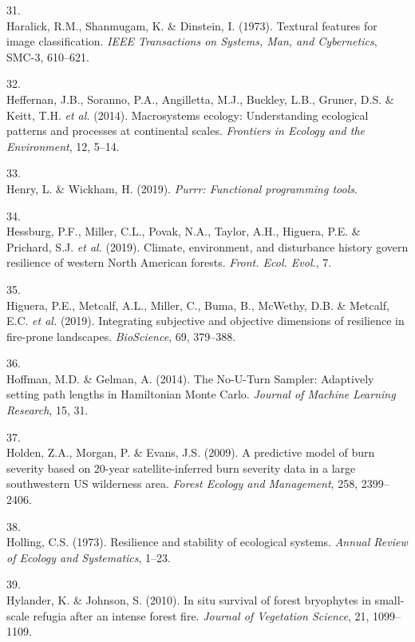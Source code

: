 \documentclass[]{article}
\begin{document}
\leavevmode\hypertarget{ref-haralick1973}{}%
31.\\
Haralick, R.M., Shanmugam, K. \& Dinstein, I. (1973). Textural features
for image classification. \emph{IEEE Transactions on Systems, Man, and
Cybernetics}, SMC-3, 610--621.

\leavevmode\hypertarget{ref-heffernan2014}{}%
32.\\
Heffernan, J.B., Soranno, P.A., Angilletta, M.J., Buckley, L.B., Gruner,
D.S. \& Keitt, T.H. \emph{et al.} (2014). Macrosystems ecology:
Understanding ecological patterns and processes at continental scales.
\emph{Frontiers in Ecology and the Environment}, 12, 5--14.

\leavevmode\hypertarget{ref-henry2019}{}%
33.\\
Henry, L. \& Wickham, H. (2019). \emph{Purrr: Functional programming
tools}.

\leavevmode\hypertarget{ref-hessburg2019}{}%
34.\\
Hessburg, P.F., Miller, C.L., Povak, N.A., Taylor, A.H., Higuera, P.E.
\& Prichard, S.J. \emph{et al.} (2019). Climate, environment, and
disturbance history govern resilience of western North American forests.
\emph{Front. Ecol. Evol.}, 7.

\leavevmode\hypertarget{ref-higuera2019}{}%
35.\\
Higuera, P.E., Metcalf, A.L., Miller, C., Buma, B., McWethy, D.B. \&
Metcalf, E.C. \emph{et al.} (2019). Integrating subjective and objective
dimensions of resilience in fire-prone landscapes. \emph{BioScience},
69, 379--388.

\leavevmode\hypertarget{ref-hoffman2014}{}%
36.\\
Hoffman, M.D. \& Gelman, A. (2014). The No-U-Turn Sampler: Adaptively
setting path lengths in Hamiltonian Monte Carlo. \emph{Journal of
Machine Learning Research}, 15, 31.

\leavevmode\hypertarget{ref-holden2009}{}%
37.\\
Holden, Z.A., Morgan, P. \& Evans, J.S. (2009). A predictive model of
burn severity based on 20-year satellite-inferred burn severity data in
a large southwestern US wilderness area. \emph{Forest Ecology and
Management}, 258, 2399--2406.

\leavevmode\hypertarget{ref-holling1973}{}%
38.\\
Holling, C.S. (1973). Resilience and stability of ecological systems.
\emph{Annual Review of Ecology and Systematics}, 1--23.

\leavevmode\hypertarget{ref-hylander2010}{}%
39.\\
Hylander, K. \& Johnson, S. (2010). In situ survival of forest
bryophytes in small-scale refugia after an intense forest fire.
\emph{Journal of Vegetation Science}, 21, 1099--1109.
\end{document}
